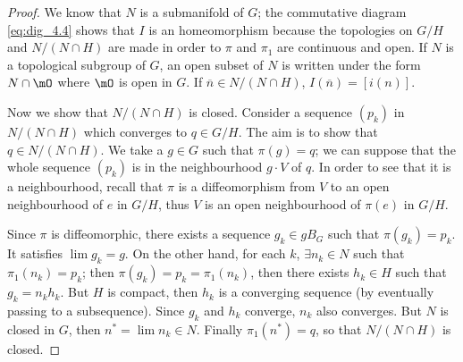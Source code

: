 \begin{proof}
We know that $N$ is a submanifold of $G$; the commutative diagram \eqref{eq:dig_4.4} shows that $I$ is an homeomorphism because the topologies on $G/H$ and $N/(N\cap H)$ are made in order to $\pi$ and $\pi_1$ are continuous and open. If $N$ is a topological subgroup of $G$, an open subset of $N$ is written under the form $N\cap\mO$ where $\mO$ is open in $G$. If $\overline{n}\in N/(N\cap H)$, $I(\overline{n})=[i(n)]$.

Now we show that $N/(N\cap H)$ is closed. Consider a sequence $(p_k)$ in $N/(N\cap H)$ which converges to $q\in G/H$. The aim is to show that $q\in N/(N\cap H)$. We take a $g\in G$ such that $\pi(g)=q$; we can suppose that the whole sequence $(p_k)$ is in the neighbourhood $g\cdot V$ of $q$. In order to see that it is a neighbourhood, recall that $\pi$ is a diffeomorphism from $V$ to an open neighbourhood of $e$ in $G/H$, thus $V$ is an open neighbourhood of $\pi(e)$ in $G/H$.

Since $\pi$ is diffeomorphic, there exists a sequence $g_k\in gB_G$ such that $\pi(g_k)=p_k$. It satisfies $\lim g_k=g$. On the other hand, for each $k$, $\exists n_k\in N$ such that $\pi_1(n_k)=p_k$; then $\pi(g_k)=p_k=\pi_1(n_k)$, then there exists $h_k\in H$ such that $g_k=n_kh_k$. But $H$ is compact, then $h_k$ is a converging sequence (by eventually passing to a subsequence). Since $g_k$ and $h_k$ converge, $n_k$ also converges. But $N$ is closed in $G$, then $n^*=\lim n_k\in N$. Finally $\pi_1(n^*)=q$, so that $N/(N\cap H)$ is closed.
\end{proof}
